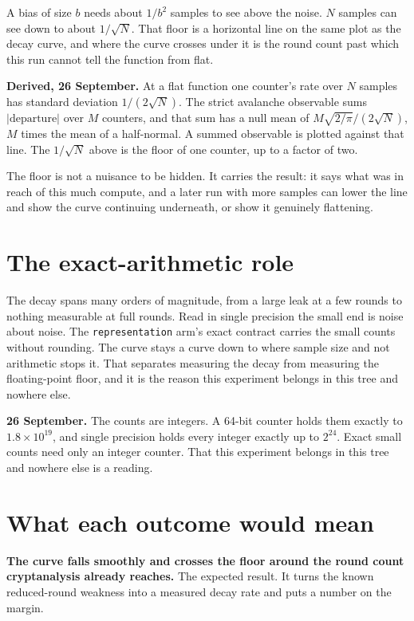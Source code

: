 A bias of size \(b\) needs about \(1/b^2\) samples to see above the noise. \(N\) samples can see down to about \(1/\sqrt{N}\). That floor is a horizontal line on the same plot as the decay curve, and where the curve crosses under it is the round count past which this run cannot tell the function from flat.

\textbf{Derived, 26 September.} At a flat function one counter's rate over \(N\) samples has standard deviation \(1/(2\sqrt{N})\). The strict avalanche observable sums \(|\text{departure}|\) over \(M\) counters, and that sum has a null mean of \(M\sqrt{2/\pi}/(2\sqrt{N})\), \(M\) times the mean of a half-normal. A summed observable is plotted against that line. The \(1/\sqrt{N}\) above is the floor of one counter, up to a factor of two.

The floor is not a nuisance to be hidden. It carries the result: it says what was in reach of this much compute, and a later run with more samples can lower the line and show the curve continuing underneath, or show it genuinely flattening.

\section{The exact-arithmetic role}

The decay spans many orders of magnitude, from a large leak at a few rounds to nothing measurable at full rounds. Read in single precision the small end is noise about noise. The \texttt{representation} arm's exact contract carries the small counts without rounding. The curve stays a curve down to where sample size and not arithmetic stops it. That separates measuring the decay from measuring the floating-point floor, and it is the reason this experiment belongs in this tree and nowhere else.

\textbf{26 September.} The counts are integers. A 64-bit counter holds them exactly to \(1.8 \times 10^{19}\), and single precision holds every integer exactly up to \(2^{24}\). Exact small counts need only an integer counter. That this experiment belongs in this tree and nowhere else is a reading.

\section{What each outcome would mean}

\textbf{The curve falls smoothly and crosses the floor around the round count cryptanalysis already reaches.} The expected result. It turns the known reduced-round weakness into a measured decay rate and puts a number on the margin.

